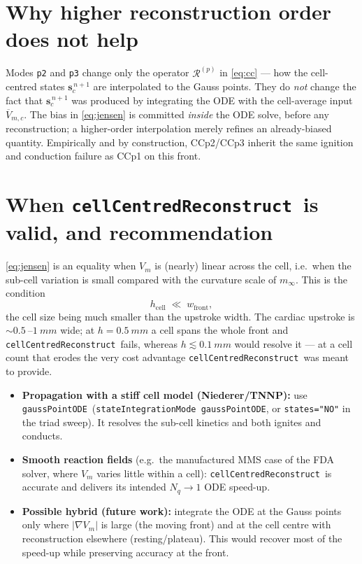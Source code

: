 \documentclass[11pt,a4paper]{article}
\newcommand{\Vm}{V_{m}}
\newcommand{\grad}{\nabla}
\newcommand{\code}[1]{\texttt{\small #1}}
\newcommand{\gpode}{\code{gaussPointODE}}
\newcommand{\ccrec}{\code{cellCentredReconstruct}}
\newcommand{\states}{\mathbf{s}}
\newcommand{\Vbarc}{\overline{V}_{m,c}}
\begin{document}
\section{Why higher reconstruction order does not help}

Modes \code{p2} and \code{p3} change only the operator $\mathcal{R}^{(p)}$ in
\eqref{eq:cc} --- how the cell-centred states $\states_c^{\,n+1}$ are interpolated
to the Gauss points. They do \emph{not} change the fact that $\states_c^{\,n+1}$
was produced by integrating the ODE with the cell-average input $\Vbarc$. The
bias in \eqref{eq:jensen} is committed \emph{inside} the ODE solve, before any
reconstruction; a higher-order interpolation merely refines an already-biased
quantity. Empirically and by construction, CCp2/CCp3 inherit the same ignition
and conduction failure as CCp1 on this front.

\section{When \ccrec\ is valid, and recommendation}

\eqref{eq:jensen} is an equality when $\Vm$ is (nearly) linear across the cell,
i.e.\ when the sub-cell variation is small compared with the curvature scale of
$m_\infty$. This is the condition
\begin{equation}
  h_{\text{cell}} \;\ll\; w_{\text{front}},
\end{equation}
the cell size being much smaller than the upstroke width. The cardiac upstroke is
${\sim}\SI{0.5}{}$--$\SI{1}{mm}$ wide; at $h=\SI{0.5}{mm}$ a cell spans the whole
front and \ccrec\ fails, whereas $h\lesssim\SI{0.1}{mm}$ would resolve it --- at a
cell count that erodes the very cost advantage \ccrec\ was meant to provide.

\begin{itemize}[leftmargin=1.4em,nosep]
  \item \textbf{Propagation with a stiff cell model (Niederer/TNNP):} use
    \gpode\ (\code{stateIntegrationMode gaussPointODE}, or \code{states="NO"} in
    the triad sweep). It resolves the sub-cell kinetics and both ignites and
    conducts.
  \item \textbf{Smooth reaction fields} (e.g.\ the manufactured MMS case of the
    FDA solver, where $\Vm$ varies little within a cell): \ccrec\ is accurate and
    delivers its intended $N_q\!\to\!1$ ODE speed-up.
  \item \textbf{Possible hybrid (future work):} integrate the ODE at the Gauss
    points only where $\lvert\grad\Vm\rvert$ is large (the moving front) and at
    the cell centre with reconstruction elsewhere (resting/plateau). This would
    recover most of the speed-up while preserving accuracy at the front.
\end{itemize}
\end{document}
